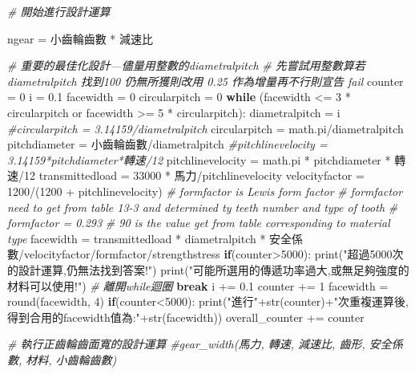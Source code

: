 \documentclass[]{article}
\newenvironment{Shaded}{}{}
\newcommand{\KeywordTok}[1]{\textcolor[rgb]{0.00,0.44,0.13}{\textbf{{#1}}}}
\newcommand{\DataTypeTok}[1]{\textcolor[rgb]{0.56,0.13,0.00}{{#1}}}
\newcommand{\DecValTok}[1]{\textcolor[rgb]{0.25,0.63,0.44}{{#1}}}
\newcommand{\FloatTok}[1]{\textcolor[rgb]{0.25,0.63,0.44}{{#1}}}
\newcommand{\StringTok}[1]{\textcolor[rgb]{0.25,0.44,0.63}{{#1}}}
\newcommand{\CommentTok}[1]{\textcolor[rgb]{0.38,0.63,0.69}{\textit{{#1}}}}
\newcommand{\NormalTok}[1]{{#1}}
\begin{document}
\begin{Shaded}
\begin{Highlighting}[]
    \CommentTok{# 開始進行設計運算}

    \NormalTok{ngear = 小齒輪齒數 * 減速比}

    \CommentTok{# 重要的最佳化設計---儘量用整數的diametralpitch}
    \CommentTok{# 先嘗試用整數算若 diametralpitch 找到100 仍無所獲則改用 0.25 作為增量再不行則宣告 fail}
    \NormalTok{counter = }\DecValTok{0}
    \NormalTok{i = }\FloatTok{0.1}
    \NormalTok{facewidth = }\DecValTok{0}
    \NormalTok{circularpitch = }\DecValTok{0}
    \KeywordTok{while} \NormalTok{(facewidth <= }\DecValTok{3} \NormalTok{* circularpitch or facewidth >= }\DecValTok{5} \NormalTok{* circularpitch):}
        \NormalTok{diametralpitch = i}
        \CommentTok{#circularpitch = 3.14159/diametralpitch}
        \NormalTok{circularpitch = math.pi/diametralpitch}
        \NormalTok{pitchdiameter = 小齒輪齒數/diametralpitch}
        \CommentTok{#pitchlinevelocity = 3.14159*pitchdiameter*轉速/12}
        \NormalTok{pitchlinevelocity = math.pi * pitchdiameter * 轉速/}\DecValTok{12}
        \NormalTok{transmittedload = }\DecValTok{33000} \NormalTok{* 馬力/pitchlinevelocity}
        \NormalTok{velocityfactor = }\DecValTok{1200}\NormalTok{/(}\DecValTok{1200} \NormalTok{+ pitchlinevelocity)}
        \CommentTok{# formfactor is Lewis form factor}
        \CommentTok{# formfactor need to get from table 13-3 and determined ty teeth number and type of tooth}
        \CommentTok{# formfactor = 0.293}
        \CommentTok{# 90 is the value get from table corresponding to material type}
        \NormalTok{facewidth = transmittedload * diametralpitch * 安全係數/velocityfactor/formfactor/strengthstress}
        \KeywordTok{if}\NormalTok{(counter>}\DecValTok{5000}\NormalTok{):}
            \DataTypeTok{print}\NormalTok{(}\StringTok{"超過5000次的設計運算,仍無法找到答案!"}\NormalTok{)}
            \DataTypeTok{print}\NormalTok{(}\StringTok{"可能所選用的傳遞功率過大,或無足夠強度的材料可以使用!"}\NormalTok{)}
            \CommentTok{# 離開while迴圈}
            \KeywordTok{break}
        \NormalTok{i += }\FloatTok{0.1}
        \NormalTok{counter += }\DecValTok{1}
    \NormalTok{facewidth = }\DataTypeTok{round}\NormalTok{(facewidth, }\DecValTok{4}\NormalTok{)}
    \KeywordTok{if}\NormalTok{(counter<}\DecValTok{5000}\NormalTok{):}
        \DataTypeTok{print}\NormalTok{(}\StringTok{"進行"}\NormalTok{+}\DataTypeTok{str}\NormalTok{(counter)+}\StringTok{"次重複運算後,得到合用的facewidth值為:"}\NormalTok{+}\DataTypeTok{str}\NormalTok{(facewidth))}
    \NormalTok{overall_counter += counter}

\CommentTok{# 執行正齒輪齒面寬的設計運算}
\CommentTok{#gear_width(馬力, 轉速, 減速比, 齒形, 安全係數, 材料, 小齒輪齒數)}


\end{Highlighting}
\end{Shaded}
\end{document}
